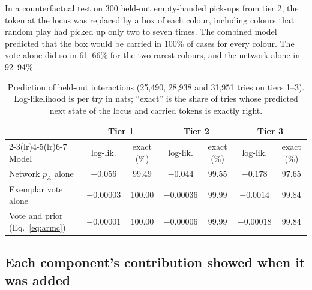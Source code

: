 \documentclass{article}
\begin{document}
In a counterfactual test on 300 held-out empty-handed pick-ups from tier 2, the token at the locus was replaced by a box of each colour, including colours that random play had picked up only two to seven times. The combined model predicted that the box would be carried in 100\% of cases for every colour. The vote alone did so in 61--66\% for the two rarest colours, and the network alone in 92--94\%.

\begin{table}[t]
    \caption{Prediction of held-out interactions (25,490, 28,938 and 31,951 tries on tiers 1--3). Log-likelihood is per try in nats; ``exact'' is the share of tries whose predicted next state of the locus and carried tokens is exactly right.}
    \centering
    \small
    \setlength{\tabcolsep}{4pt}
    \begin{tabular}{lcccccc}
        \toprule
        & \multicolumn{2}{c}{Tier 1} & \multicolumn{2}{c}{Tier 2} & \multicolumn{2}{c}{Tier 3} \\
        \cmidrule(lr){2-3}\cmidrule(lr){4-5}\cmidrule(lr){6-7}
        Model & log-lik. & exact (\%) & log-lik. & exact (\%) & log-lik. & exact (\%) \\
        \midrule
        Network $p_A$ alone & $-0.056$ & 99.49 & $-0.044$ & 99.55 & $-0.178$ & 97.65 \\
        Exemplar vote alone & $-0.00003$ & 100.00 & $-0.00036$ & 99.99 & $-0.0014$ & 99.84 \\
        Vote and prior (Eq.~\ref{eq:armc}) & $-0.00001$ & 100.00 & $-0.00006$ & 99.99 & $-0.00018$ & 99.84 \\
        \bottomrule
    \end{tabular}
    \label{tab:prediction}
\end{table}

\subsection{Each component's contribution showed when it was added}
\end{document}
